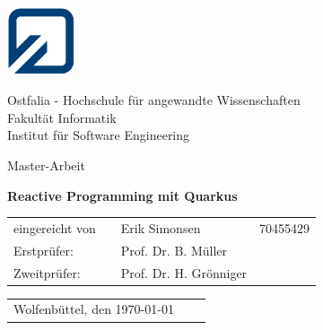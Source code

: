 \begin{minipage}{2.1cm}
	\includegraphics[width=2cm]{resources/fh_logo_klein.jpg}
\end{minipage}
\begin{minipage}{10.0cm}
	Ostfalia - Hochschule für angewandte Wissenschaften\\
	Fakultät Informatik\\
	Institut für Software Engineering
\end{minipage}

\vspace{35mm}

\begin{center}
	{\LARGE Master-Arbeit}
	\\[10mm]
\end{center}

\begin{center}
	\LARGE \textbf{Reactive Programming mit Quarkus\\[28mm]}
\end{center}

\begin{table}[h]
	\centering
	\hspace{50mm}\begin{tabular}{lcll}
		eingereicht von &  & Erik Simonsen          & 70455429 \\

		Erstprüfer:     &  & Prof. Dr. B. Müller    &          \\
		Zweitprüfer:    &  & Prof. Dr. H. Grönniger &          \\
	\end{tabular}
\end{table}

\vspace{30mm}

\begin{table}[h]
	\begin{tabular}{lll}
		Wolfenbüttel, den \today \\
	\end{tabular}
\end{table}
\clearpage
